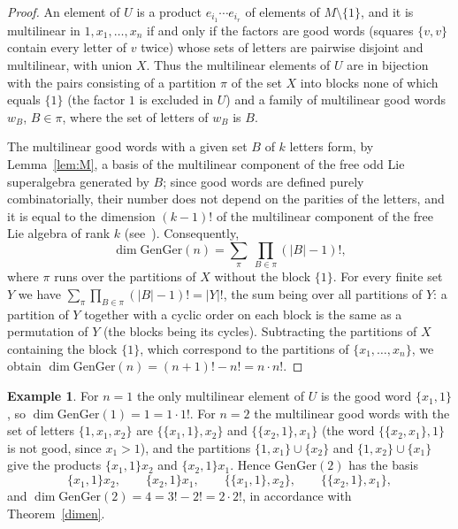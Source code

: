 \documentclass[11pt,reqno]{amsart}
\theoremstyle{plain}
\theoremstyle{definition}
\newtheorem{example}{Example}
\theoremstyle{remark}
\begin{document}
\begin{proof}
An element of $U$ is a product $e_{i_1}\cdots e_{i_r}$ of elements of $M\setminus\{1\}$, and it is multilinear in $1,x_1,\dots,x_n$ if and only if the factors are good words (squares $\{v,v\}$ contain every letter of $v$ twice) whose sets of letters are pairwise disjoint and multilinear, with union $X$.
Thus the multilinear elements of $U$ are in bijection with the pairs consisting of a partition $\pi$ of the set $X$ into blocks none of which equals $\{1\}$ (the factor $1$ is excluded in $U$) and a family of multilinear good words $w_B$, $B\in\pi$, where the set of letters of $w_B$ is $B$.

The multilinear good words with a given set $B$ of $k$ letters form, by Lemma~\ref{lem:M}, a basis of the multilinear component of the free odd Lie superalgebra generated by $B$; since good words are defined purely combinatorially, their number does not depend on the parities of the letters, and it is equal to the dimension $(k-1)!$ of the multilinear component of the free Lie algebra of rank $k$ (see~\cite{Reu93}).
Consequently,
$$
\dim\mathrm{GenGer}(n)=\sum_{\pi}\ \prod_{B\in\pi}(|B|-1)!,
$$
where $\pi$ runs over the partitions of $X$ without the block $\{1\}$.
For every finite set $Y$ we have $\sum_{\pi}\prod_{B\in\pi}(|B|-1)!=|Y|!$, the sum being over all partitions of $Y$: a partition of $Y$ together with a cyclic order on each block is the same as a permutation of $Y$ (the blocks being its cycles).
Subtracting the partitions of $X$ containing the block $\{1\}$, which correspond to the partitions of $\{x_1,\dots,x_n\}$, we obtain $\dim\mathrm{GenGer}(n)=(n+1)!-n!=n\cdot n!$.
\end{proof}

\begin{example}\label{ex:small}
For $n=1$ the only multilinear element of $U$ is the good word $\{x_1,1\}$, so $\dim\mathrm{GenGer}(1)=1=1\cdot1!$.
For $n=2$ the multilinear good words with the set of letters $\{1,x_1,x_2\}$ are $\{\{x_1,1\},x_2\}$ and $\{\{x_2,1\},x_1\}$ (the word $\{\{x_2,x_1\},1\}$ is not good, since $x_1>1$), and the partitions $\{1,x_1\}\cup\{x_2\}$ and $\{1,x_2\}\cup\{x_1\}$ give the products $\{x_1,1\}x_2$ and $\{x_2,1\}x_1$.
Hence $\mathrm{GenGer}(2)$ has the basis
$$
\{x_1,1\}x_2,\qquad \{x_2,1\}x_1,\qquad \{\{x_1,1\},x_2\},\qquad \{\{x_2,1\},x_1\},
$$
and $\dim\mathrm{GenGer}(2)=4=3!-2!=2\cdot2!$, in accordance with Theorem~\ref{dimen}.
\end{example}
\end{document}
